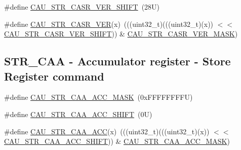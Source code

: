 \begin{DoxyCompactItemize}
\#define \mbox{\hyperlink{group___c_a_u___register___masks_ga8103f4482a52d4ea2c47a26161596b66}{C\+A\+U\+\_\+\+S\+T\+R\+\_\+\+C\+A\+S\+R\+\_\+\+V\+E\+R\+\_\+\+S\+H\+I\+FT}}~(28\+U)
\item 
\#define \mbox{\hyperlink{group___c_a_u___register___masks_ga1b0d6cb73fdaaf5a5d9adc1c95d296c6}{C\+A\+U\+\_\+\+S\+T\+R\+\_\+\+C\+A\+S\+R\+\_\+\+V\+ER}}(x)~(((uint32\+\_\+t)(((uint32\+\_\+t)(x)) $<$$<$ \mbox{\hyperlink{group___c_a_u___register___masks_ga8103f4482a52d4ea2c47a26161596b66}{C\+A\+U\+\_\+\+S\+T\+R\+\_\+\+C\+A\+S\+R\+\_\+\+V\+E\+R\+\_\+\+S\+H\+I\+FT}})) \& \mbox{\hyperlink{group___c_a_u___register___masks_ga5447564cf9ebe8e0ed52d5367304d0cd}{C\+A\+U\+\_\+\+S\+T\+R\+\_\+\+C\+A\+S\+R\+\_\+\+V\+E\+R\+\_\+\+M\+A\+SK}})
\end{DoxyCompactItemize}
\subsection*{S\+T\+R\+\_\+\+C\+AA -\/ Accumulator register -\/ Store Register command}
\begin{DoxyCompactItemize}
\item 
\#define \mbox{\hyperlink{group___c_a_u___register___masks_gafdeac08a5e2a414586e6cfb318a3beca}{C\+A\+U\+\_\+\+S\+T\+R\+\_\+\+C\+A\+A\+\_\+\+A\+C\+C\+\_\+\+M\+A\+SK}}~(0x\+F\+F\+F\+F\+F\+F\+F\+F\+U)
\item 
\#define \mbox{\hyperlink{group___c_a_u___register___masks_gaad9cefe85fb570468c92429a601f3c30}{C\+A\+U\+\_\+\+S\+T\+R\+\_\+\+C\+A\+A\+\_\+\+A\+C\+C\+\_\+\+S\+H\+I\+FT}}~(0\+U)
\item 
\#define \mbox{\hyperlink{group___c_a_u___register___masks_ga4866a4555a25ed3cc3d5b1270b619834}{C\+A\+U\+\_\+\+S\+T\+R\+\_\+\+C\+A\+A\+\_\+\+A\+CC}}(x)~(((uint32\+\_\+t)(((uint32\+\_\+t)(x)) $<$$<$ \mbox{\hyperlink{group___c_a_u___register___masks_gaad9cefe85fb570468c92429a601f3c30}{C\+A\+U\+\_\+\+S\+T\+R\+\_\+\+C\+A\+A\+\_\+\+A\+C\+C\+\_\+\+S\+H\+I\+FT}})) \& \mbox{\hyperlink{group___c_a_u___register___masks_gafdeac08a5e2a414586e6cfb318a3beca}{C\+A\+U\+\_\+\+S\+T\+R\+\_\+\+C\+A\+A\+\_\+\+A\+C\+C\+\_\+\+M\+A\+SK}})
\end{DoxyCompactItemize}
